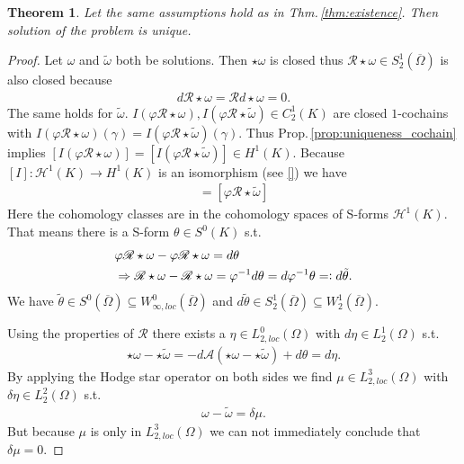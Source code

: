 \documentclass[12pt,a4paper]{article}
\numberwithin{equation}{subsection}
\numberwithin{lemma}{subsection}
\newtheorem{theorem}[lemma]{Theorem}
\theoremstyle{definition}
\newcommand{\aop}{\mathscr{A}}
\newcommand{\omegabar}{\overline{\Omega}}
\newcommand{\rop}{\mathscr{R}} %
\begin{document}
\begin{theorem}
    Let the same assumptions hold as in Thm.\,\ref{thm:existence}.
    Then solution of the problem is unique.
\end{theorem}
\begin{proof}
    Let $\omega$ and $\tilde{\omega}$ both be solutions. Then $\star\omega$ is 
    closed thus $\rop \star\omega \in S_2^1(\omegabar)$ is also closed because 
    \begin{align*}
        d \rop \star \omega = \rop d\star\omega = 0.
    \end{align*}
    The same 
    holds for $\tilde{\omega}$. 
    $I(\varphi \rop \star \omega)
    , I(\varphi \rop \star \tilde{\omega}) \in C^1_2(K)$ 
    are closed $1$-cochains with
    $I(\varphi\rop \star \omega)(\gamma) 
    = I(\varphi\rop \star \tilde{\omega})(\gamma)$. 
    Thus Prop.\,\ref{prop:uniqueness_cochain} implies 
    $[I(\varphi\rop \star \omega)] 
    = [I(\varphi\rop \star \tilde{\omega})] \in H^1(K)$.
    Because $[I]: \mathscr{H}^1(K) \rightarrow H^1(K)$ is an isomorphism
    (see \ref{}) we have 
    \begin{align*}
        [\varphi\rop \star \omega] = [\varphi\rop \star \tilde{\omega}] 
    \end{align*}
    Here the cohomology classes are in the cohomology spaces of S-forms 
    $\mathscr{H}^1(K)$. That means there is a S-form $\theta \in S^0(K)$ s.t.
    \begin{align*}
        &\varphi \rop \star\omega - \varphi \rop \star\omega = d\theta \\ 
        &\Rightarrow \rop \star\omega -  \rop \star\omega = \varphi^{-1} d\theta 
        = d\varphi^{-1}\theta =\vcentcolon d\tilde{\theta}.
    \end{align*}
    We have $\tilde{\theta} \in S^0(\omegabar) \subseteq 
    W_{\infty,loc}^0(\omegabar)$ and $d \tilde{\theta} \in S_2^1(\omegabar)
    \subseteq W_2^1(\omegabar)$.

    Using the 
    properties of $\rop$ there exists a $\eta \in L_{2,loc}^0(\Omega)$
    with $d\eta \in L^1_2(\Omega)$ s.t. 
    \begin{align*}
        \star\omega - \star\tilde{\omega} 
        = -d\aop(\star\omega - \star\tilde{\omega})
        + d \theta = d\eta.
    \end{align*}
    By applying the Hodge star operator on both sides we find 
    $\mu \in L_{2,loc}^3(\Omega)$ with $\delta \eta \in L^2_2(\Omega)$ s.t.
    \begin{align}
        \omega - \tilde{\omega} = \delta \mu. \label{difference_solutions}
    \end{align}
    But because $\mu$ is only in $L_{2,loc}^3(\Omega)$ 
    we can not immediately conclude that $\delta \mu = 0$.


\end{proof}
\end{document}
